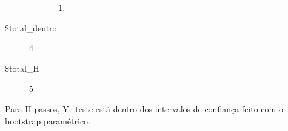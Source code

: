 \documentclass[11pt]{article}
\begin{document}
\begin{description}
\begin{description}
\begin{enumerate}
\item {}

\end{enumerate}

\end{description}

\item[\$total\_dentro] 4
\item[\$total\_H] 5
\end{description}


    
    Para H passos, Y\_teste está dentro dos intervalos de confiança feito
com o bootstrap paramétrico.


    
    
    
\end{document}

